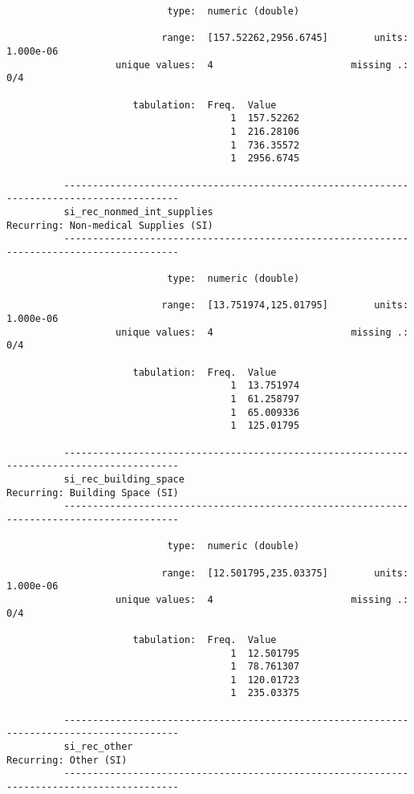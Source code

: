 \documentclass{article}
\begin{document}
\begin{verbatim}
                            type:  numeric (double)
          
                           range:  [157.52262,2956.6745]        units:  1.000e-06
                   unique values:  4                        missing .:  0/4
          
                      tabulation:  Freq.  Value
                                       1  157.52262
                                       1  216.28106
                                       1  736.35572
                                       1  2956.6745
          
          ------------------------------------------------------------------------------------------
          si_rec_nonmed_int_supplies                            Recurring: Non-medical Supplies (SI)
          ------------------------------------------------------------------------------------------
          
                            type:  numeric (double)
          
                           range:  [13.751974,125.01795]        units:  1.000e-06
                   unique values:  4                        missing .:  0/4
          
                      tabulation:  Freq.  Value
                                       1  13.751974
                                       1  61.258797
                                       1  65.009336
                                       1  125.01795
          
          ------------------------------------------------------------------------------------------
          si_rec_building_space                                       Recurring: Building Space (SI)
          ------------------------------------------------------------------------------------------
          
                            type:  numeric (double)
          
                           range:  [12.501795,235.03375]        units:  1.000e-06
                   unique values:  4                        missing .:  0/4
          
                      tabulation:  Freq.  Value
                                       1  12.501795
                                       1  78.761307
                                       1  120.01723
                                       1  235.03375
          
          ------------------------------------------------------------------------------------------
          si_rec_other                                                         Recurring: Other (SI)
          ------------------------------------------------------------------------------------------
          

\end{verbatim}
\end{document}
